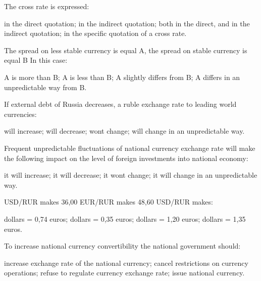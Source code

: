 \documentclass[12pt, table]{exam}
\begin{document}
\begin{questions}
\begin{multicols}{2}
\question The cross rate is expressed:
	 \begin{choices}
	 \choice in the direct quotation;
	 \CC in the indirect quotation;
	 \choice both in the direct, and in the indirect quotation;
	 \choice in the specific quotation of a cross rate.
	 \end{choices}
\question The spread on less stable currency is equal A, the spread on stable currency is equal B In this case:
	 \begin{choices}
	 \choice A is more than B;
	 \CC A is less than B;
	 \choice A slightly differs from B;
	 \choice A differs in an unpredictable way from B.
	 \end{choices}
\question If external debt of Russia decreases, a ruble exchange rate to leading world currencies:
	 \begin{choices}
	 \CC will increase;
	 \choice will decrease;
	 \choice wont change;
	 \choice will change in an unpredictable way.
	 \end{choices}
\question Frequent unpredictable fluctuations of national currency exchange rate will make the following impact on the level of foreign investments into national economy:
	 \begin{choices}
	 \choice it will increase;
	 \CC it will decrease;
	 \choice it wont change;
	 \choice it will change in an unpredictable way.
	 \end{choices}
\question USD/RUR makes 36,00 EUR/RUR makes 48,60 USD/RUR makes:
	 \begin{choices}
	  dollars = 0,74 euros;
	  dollars = 0,35 euros;
	  dollars = 1,20 euros;
	  dollars = 1,35 euros.
	 \end{choices}
\question To increase national currency convertibility the national government should:
	 \begin{choices}
	 \CC increase exchange rate of the national currency;
	 \choice cancel restrictions on currency operations;
	 \choice refuse to regulate currency exchange rate;
	 \choice issue national currency.
	 \end{choices}
\end{multicols}
\end{questions}
\end{document}
